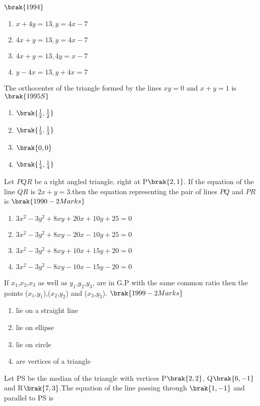 \hfill{$\brak{1994}$}
\begin{enumerate}
    
      \item $x+4y=13,y=4x-7$
    \item $4x+y=13,y=4x-7$
      \item $4x+y=13,4y=x-7$
        \item $y-4x=13,y+4x=7$
    
\end{enumerate}
\item The orthocenter of the triangle formed by the lines $xy=0$ and $x+y=1$ is 
\hfill{$\brak{1995S}$}
\begin{enumerate}
    
      \item $\brak{\frac{1}{2},\frac{1}{2}}$
      \item $\brak{\frac{1}{3},\frac{1}{3}}$
      \item $\brak{0,0}$
      \item $\brak{\frac{1}{4},\frac{1}{4}}$
    
\end{enumerate}
\item Let $PQR$ be a right angled triangle, right at P$\brak{2,1}$. If the equation of the line $QR$ is $2x+y=3$.then the equation representing the pair of lines $PQ$ and $PR$ is
\hfill{$\brak{1990-2 Marks}$}
\begin{enumerate}
    \item $3x^2-3y^2+8xy+20x+10y+25=0$
    \item $3x^2-3y^2+8xy-20x-10y+25=0$
    \item $3x^2-3y^2+8xy+10x+15y+20=0$
    \item $3x^2-3y^2-8xy-10x-15y-20=0$
\end{enumerate}
\item If $x_1$,$x_2$,$x_3$ as well as $y_1$,$y_2$,$y_3$, are in G.P with the same common ratio then the points ($x_1$,$y_1$),($x_2$,$y_2$) and ($x_3$,$y_3$).
\hfill{$\brak{1999-2 Marks}$}
\begin{enumerate}
    
        \item lie on a straight line
        \item lie on ellipse
        \item lie on circle
        \item are vertices of a triangle 
    
\end{enumerate}
\item Let PS be the median of the triangle with vertices P$\brak{2,2}$, Q$\brak{6,-1}$ and R$\brak{7,3}$.The equation of the line passing through $\brak{1,-1}$ and parallel to PS is 

